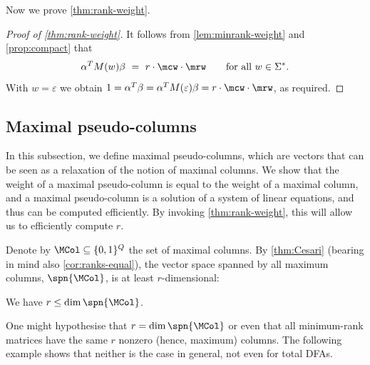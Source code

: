 \noindent
Now we prove \autoref{thm:rank-weight}.

\begin{proof}[Proof of \autoref{thm:rank-weight}]
It follows from \autoref{lem:minrank-weight} and \autoref{prop:compact} that
\[
 \alpha^T M(w) \beta \ = \ r \cdot \mcw \cdot \mrw \qquad \text{for all $w \in \Sigma^*$.}
\]
With $w = \varepsilon$ we obtain $1 = \alpha^T \beta = \alpha^T M(\varepsilon) \beta = r \cdot \mcw \cdot \mrw$, as required.
\end{proof}

\subsection{Maximal pseudo-columns}\label{subsec:pseudocolumns}

In this subsection, we define maximal pseudo-columns, which are vectors that can be seen as a relaxation of the notion of maximal columns. We show that the weight of a maximal pseudo-column is equal to the weight of a maximal column, and a maximal pseudo-column is a solution of a system of linear equations, and thus can be computed efficiently. By invoking \autoref{thm:rank-weight}, this will allow us to efficiently compute $r$.

Denote by $\MCol \subseteq \{0,1\}^Q$ the set of maximal columns.
By \autoref{thm:Cesari} (bearing in mind also \autoref{cor:ranks-equal}), the vector space spanned by all maximum columns, $\spn{\MCol}$, is at least $r$-dimensional:
\begin{prop} \label{prop:r<=MC}
We have $r \le \dim \spn{\MCol}$.
\end{prop}

\noindent
One might hypothesise that $r = \dim \spn{\MCol}$ or even that all minimum-rank matrices have the same $r$ nonzero (hence, maximum) columns.
The following example shows that neither is the case in general, not even for total DFAs.


